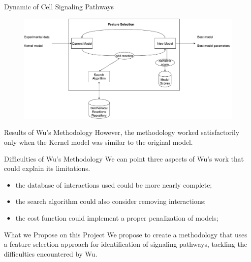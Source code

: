 \documentclass{beamer}
\begin{document}
\begin{frame}{Dynamic of Cell Signaling Pathways}
\begin{flushleft}
\begin{figure}
    \includegraphics[scale=.35]{introduction/Lulu_methodology_diagram.pdf}
\end{figure}
\end{flushleft}
\end{frame}


\begin{frame}{Results of Wu's Methodology}
However, the methodology worked satisfactorily only when the Kernel 
model was similar to the original model.
\end{frame}


\begin{frame}{Difficulties of Wu's Methodology}
We can point three aspects of Wu's work that could explain its 
limitations.
\begin{itemize}
\pause
\item{the database of interactions used could be more nearly complete;} 
\pause
\item{the search algorithm could also consider removing interactions;}
\pause
\item{the cost function could implement a proper penalization of 
models;}
\end{itemize}
\end{frame}


\begin{frame}{What we Propose on this Project}
We propose to create a methodology that uses a feature selection 
approach for identification of signaling pathways, tackling the 
difficulties encountered by Wu.
\end{frame}
\end{document}
